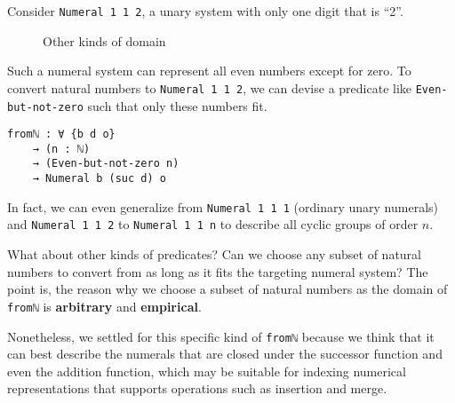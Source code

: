 \documentclass[\main/thesis.tex]{subfiles}
\begin{document}
Consider \lstinline|Numeral 1 1 2|, a unary system with only one digit
that is ``2''.

\begin{figure}[H]
    \centering
    \begin{adjustbox}{max width=\textwidth}
    \end{adjustbox}
\caption{Other kinds of domain}
\label{figure:35}
\end{figure}

Such a numeral system can represent all even numbers except for zero.
To convert natural numbers to \lstinline|Numeral 1 1 2|, we can devise a
predicate like \lstinline|Even-but-not-zero| such that only these numbers fit.

\begin{lstlisting}
fromℕ : ∀ {b d o}
    → (n : ℕ)
    → (Even-but-not-zero n)
    → Numeral b (suc d) o
\end{lstlisting}

In fact, we can even generalize from \lstinline|Numeral 1 1 1|
(ordinary unary numerals) and \lstinline|Numeral 1 1 2| to \lstinline|Numeral 1 1 n|
to describe all cyclic groups of order $ n $.

What about other kinds of predicates? Can we choose any subset of natural numbers
to convert from as long as it fits the targeting numeral system?
The point is, the reason why we choose a subset of natural numbers as the domain
of \lstinline|fromℕ| is \textbf{arbitrary} and \textbf{empirical}.

Nonetheless, we settled for this specific kind of \lstinline|fromℕ| because we
think that it can best describe the numerals that are closed under the successor
function and even the addition function, which may be suitable for indexing
numerical representations that supports operations such as insertion and merge.
\end{document}
